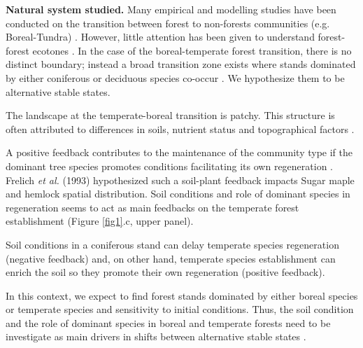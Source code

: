 
\textbf{Natural system studied.} Many empirical and modelling studies have
been conducted on the transition between forest to non-forests communities
(e.g. Boreal-Tundra) \cite{Scheffer2012,Scheffer2001,Hirota2011,Messaoud2007}.
However, little attention has been given to understand forest-forest ecotones
\cite{Goldblum2010,Graignic2013,Messaoud2007}. In the case of the boreal-temperate 
forest transition, there is no distinct boundary; instead a broad transition
zone exists where stands dominated by either coniferous or deciduous species co-occur
\cite{Goldblum2010,Fisichelli2013}. We hypothesize them to be alternative stable states.

The landscape at the temperate-boreal
transition is patchy. This structure is often attributed to
differences in soils, nutrient status and topographical factors
\cite{Society2014}.

A positive feedback contributes to the maintenance of the community type if
the dominant tree species promotes conditions facilitating its own
regeneration \cite{Barras1998}. Frelich \textit{et al.} (1993)
\cite{Society2014} hypothesized such a soil-plant feedback impacts Sugar maple
and hemlock spatial distribution. Soil conditions and role of dominant
species in regeneration seems to act as main feedbacks on the temperate forest
establishment (Figure \ref{fig1}.c, upper panel).

Soil conditions in a coniferous stand can delay
temperate species regeneration (negative feedback) 
and, on other hand,
temperate species establishment can enrich the soil so they promote their own
regeneration (positive feedback).


In this context, we expect to find forest stands dominated by either boreal
species or temperate species and sensitivity to initial conditions. Thus, the
soil condition and the role of dominant species in boreal and temperate
forests need to be investigate as main drivers in shifts between alternative
stable states \cite{Kellman2004,Moore2008,DeFrenne2013,Barras1998}.


